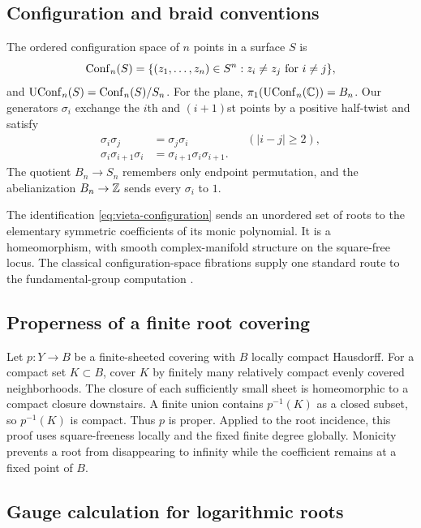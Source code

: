 \subsection{Configuration and braid conventions}

The ordered configuration space of $n$ points in a surface $S$ is
\[
 \operatorname{Conf}_n(S)=\{(z_1,\ldots,z_n)\in S^n:z_i\ne z_j\text{ for }i\ne j\},
\]
and $\operatorname{UConf}_n(S)=\operatorname{Conf}_n(S)/S_n$.  For the plane,
$\pi_1(\operatorname{UConf}_n(\mathbb{C}))=B_n$.  Our generators $\sigma_i$ exchange the $i$th and
$(i+1)$st points by a positive half-twist and satisfy
\begin{align*}
 \sigma_i\sigma_j&=\sigma_j\sigma_i &&(|i-j|\ge2),\\
 \sigma_i\sigma_{i+1}\sigma_i
 &=\sigma_{i+1}\sigma_i\sigma_{i+1}.&&
\end{align*}
The quotient $B_n\to S_n$ remembers only endpoint permutation, and the
abelianization $B_n\to\mathbb{Z}$ sends every $\sigma_i$ to $1$.

The identification \eqref{eq:vieta-configuration} sends an unordered set of roots
to the elementary symmetric coefficients of its monic polynomial.  It is a
homeomorphism, with smooth complex-manifold structure on the square-free locus.
The classical configuration-space fibrations supply one standard route to the
fundamental-group computation \cite{FadellNeuwirth1962ConfigurationSpaces}.

\subsection{Properness of a finite root covering}

Let $p:Y\to B$ be a finite-sheeted covering with $B$ locally compact Hausdorff.
For a compact set $K\subset B$, cover $K$ by finitely many relatively compact
evenly covered neighborhoods.  The closure of each sufficiently small sheet is
homeomorphic to a compact closure downstairs.  A finite union contains
$p^{-1}(K)$ as a closed subset, so $p^{-1}(K)$ is compact.  Thus $p$ is proper.
Applied to the root incidence, this proof uses square-freeness locally and the
fixed finite degree globally.  Monicity prevents a root from disappearing to
infinity while the coefficient remains at a fixed point of $B$.

\subsection{Gauge calculation for logarithmic roots}

